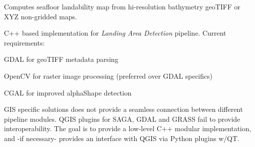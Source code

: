 Computes seafloor landability map from hi-\/resolution bathymetry geo\+T\+I\+FF or X\+YZ non-\/gridded maps.

C++ based implementation for {\itshape Landing Area Detection} pipeline. Current requirements\+:


\begin{DoxyItemize}
\item G\+D\+AL for geo\+T\+I\+FF metadata parsing
\item Open\+CV for raster image processing (preferred over G\+D\+AL specifics)
\item C\+G\+AL for improved alpha\+Shape detection
\end{DoxyItemize}

G\+IS specific solutions does not provide a seamless connection between different pipeline modules. Q\+G\+IS plugins for S\+A\+GA, G\+D\+AL and G\+R\+A\+SS fail to provide interoperability. The goal is to provide a low-\/level C++ modular implementation, and -\/if necessary-\/ provides an interface with Q\+G\+IS via Python plugins w/\+QT. 